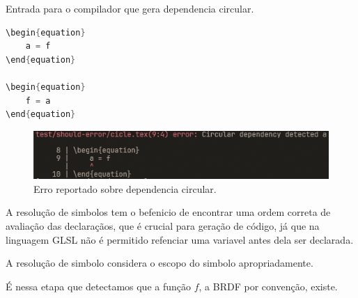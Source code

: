 \begin{codigo}[htb]
    \caption{\small Entrada para o compilador que gera dependencia circular. }
    \label{cod-grafo-simbol-deps}
\begin{lstlisting}[language=C, numbers=none, frame=none, inputencoding=latin1]
\begin{equation}
    a = f
\end{equation}

\begin{equation}
    f = a
\end{equation}

\end{lstlisting}
\end{codigo}

\begin{figure}[H]
    \caption{\label{label} \small Erro reportado sobre dependencia circular.}
    \begin{center}
        \includegraphics[scale=0.5]{./Imagens/error-circular-deps.png}
    \end{center}
\end{figure}

A resolução de simbolos tem o befenicio de encontrar uma ordem correta de avaliação das declaraçãos, que é crucial para geração de código, já que na linguagem GLSL não é permitido refenciar uma variavel antes dela ser declarada.

A resolução de simbolo considera o escopo do simbolo apropriadamente.

É nessa etapa que detectamos que a função $f$, a BRDF por convenção, existe.


